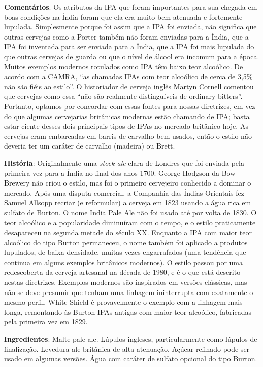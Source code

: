 \textbf{Comentários}: Os atributos da IPA que foram importantes para sua chegada em boas condições na Índia foram que ela era muito bem atenuada e fortemente lupulada. Simplesmente porque foi assim que a IPA foi enviada, não significa que outras cervejas como a Porter também não foram enviadas para a Índia, que a IPA foi inventada para ser enviada para a Índia, que a IPA foi mais lupulada do que outras cervejas de guarda ou que o nível de álcool era incomum para a época. Muitos exemplos modernos rotulados como IPA têm baixo teor alcoólico. De acordo com a CAMRA, “as chamadas IPAs com teor alcoólico de cerca de 3,5\% não são fiéis ao estilo”. O historiador de cerveja inglês Martyn Cornell comentou que cervejas como essa “não são realmente distinguíveis de ordinary bitters”. Portanto, optamos por concordar com essas fontes para nossas diretrizes, em vez do que algumas cervejarias britânicas modernas estão chamando de IPA; basta estar ciente desses dois principais tipos de IPAs no mercado britânico hoje. As cervejas eram embarcadas em barris de carvalho bem usados, então o estilo não deveria ter um caráter de carvalho (madeira) ou Brett.

\textbf{História}: Originalmente uma \textit{stock ale} clara de Londres que foi enviada pela primeira vez para a Índia no final dos anos 1700. George Hodgson da Bow Brewery não criou o estilo, mas foi o primeiro cervejeiro conhecido a dominar o mercado. Após uma disputa comercial, a Companhia das Índias Orientais fez Samuel Allsopp recriar (e reformular) a cerveja em 1823 usando a água rica em sulfato de Burton. O nome India Pale Ale não foi usado até por volta de 1830. O teor alcoólico e a popularidade diminuíram com o tempo, e o estilo praticamente desapareceu na segunda metade do século XX. Enquanto a IPA com maior teor alcoólico do tipo Burton permaneceu, o nome também foi aplicado a produtos lupulados, de baixa densidade, muitas vezes engarrafados (uma tendência que continua em alguns exemplos britânicos modernos). O estilo passou por uma redescoberta da cerveja artesanal na década de 1980, e é o que está descrito nestas diretrizes. Exemplos modernos são inspirados em versões clássicas, mas não se deve presumir que tenham uma linhagem ininterrupta com exatamente o mesmo perfil. White Shield é provavelmente o exemplo com a linhagem mais longa, remontando às Burton IPAs antigas com maior teor alcoólico, fabricadas pela primeira vez em 1829.

\textbf{Ingredientes}: Malte pale ale. Lúpulos ingleses, particularmente como lúpulos de finalização. Levedura ale britânica de alta atenuação. Açúcar refinado pode ser usado em algumas versões. Água com caráter de sulfato opcional do tipo Burton.

